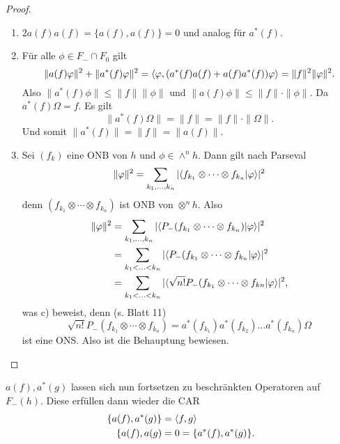 \documentclass{mycourse}
\begin{document}
\begin{proof}
\begin{enumerate}[1)]
\item $2a(f)a(f) =\{a(f), a(f)\} =0$ und analog für $a^*(f)$. \fixme[ausschreiben]
\item Für alle $\phi \in F_- \cap F_0$ gilt
\[
\|a(f) \varphi \|^2 + \| a^*(f) \varphi \|^2 = \langle \varphi, (a^*(f) a(f) + a(f) a^*(f)) \varphi\rangle = \|f\|^2 \|\varphi\|^2.
\]
Also $\|a^*(f) \phi \| \le \| f\| \| \phi \|$ und $\| a(f) \phi \| \le \| f\| \cdot \| \phi \|$. Da $a^*(f) \Omega = f$. Es gilt
\[
\| a^*(f) \Omega\| = \| f\| = \| f \| \cdot \|\Omega\|.
\]
Und somit $\|a^*(f)\| = \|f\| = \| a(f)\|$.
\item Sei $(f_k)$ eine ONB von $h$ und $\phi \in \wedge^n h$. Dann gilt nach Parseval
\[
\|\varphi \|^2 = \sum_{k_1,...,k_n} | \langle f_{k_1} \otimes \cdots \otimes f_{k_n} | \varphi \rangle|^2
\]
denn $(f_{k_1} \otimes \cdots \otimes f_{k_n})$ ist ONB von $\otimes^n h$. Also 
\begin{align*}
\| \varphi\|^2 &= \sum_{k_1,..., k_n} |\langle P_-(f_{k_1} \otimes \cdots \otimes f_{k_n})| \varphi\rangle|^2\\
&= \sum_{k_1 < ... < k_n} |\langle P_-(f_{k_1} \otimes \cdots \otimes f_{k_n}|\varphi\rangle |^2 \\
&= \sum_{k_1 < ... < k_n} |\langle \sqrt{n!} P_-(f_{k_1} \otimes \cdots \otimes f_{kn} | \varphi \rangle |^2,
\end{align*}
was c) beweist, denn (s. Blatt 11)
\[
	\sqrt{n!} P_-(f_{k_1} \otimes \cdots \otimes f_{k_n}) = a^*(f_{k_1}) a^*(f_{k_2}) ... a^*(f_{k_n}) \Omega
\]
ist eine ONS. Also ist die Behauptung bewiesen.
\end{enumerate}
\end{proof}


\begin{nt*}
$a(f), a^*(g)$ lassen sich nun fortsetzen zu beschränkten Operatoren auf $F_-(h)$. Diese erfüllen dann wieder die CAR
\begin{align*}
\{a(f), a^*(g) \} &= \langle f,g\rangle\\
\{a(f), a(g)&= 0 =\{a^*(f), a^*(g)\}.
\end{align*}
\end{nt*}
\end{document}
